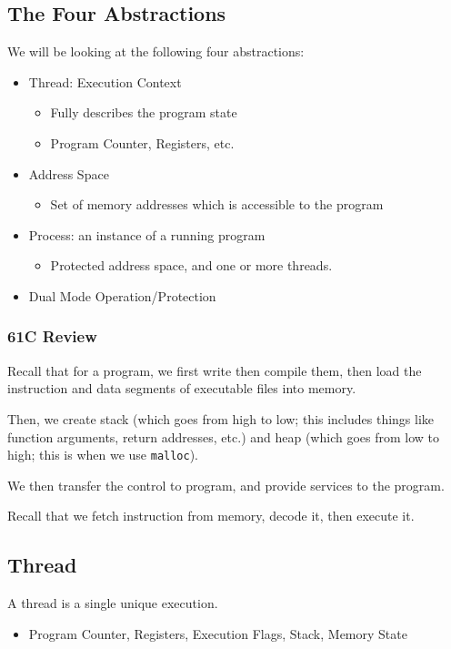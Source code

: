 \documentclass[openany]{book}
\begin{document}
\subsection{The Four Abstractions}
We will be looking at the following four abstractions:
\begin{itemize}
	\item Thread: Execution Context
	\begin{itemize}
		\item Fully describes the program state
		\item Program Counter, Registers, etc.
	\end{itemize}
	\item Address Space
	\begin{itemize}
		\item Set of memory addresses which is accessible to the program
	\end{itemize}
	\item Process: an instance of a running program
	\begin{itemize}
		\item Protected address space, and one or more threads.
	\end{itemize}
	\item Dual Mode Operation/Protection
\end{itemize}

\subsubsection{61C Review}
Recall that for a program, we first write then compile them, then load the instruction and data segments of executable files into memory.

Then, we create stack (which goes from high to low; this includes things like function arguments, return addresses, etc.) and heap (which goes from low to high; this is when we use \texttt{malloc}).

We then transfer the control to program, and provide services to the program.

Recall that we fetch instruction from memory, decode it, then execute it.

\subsection{Thread}
\begin{defn}[Thread]
	A thread is a single unique execution.
	\begin{itemize}
		\item Program Counter, Registers, Execution Flags, Stack, Memory State
	\end{itemize}
\end{defn}
\end{document}
